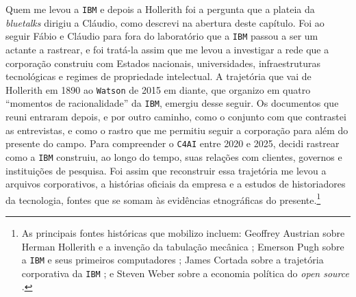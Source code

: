 Quem me levou a \texttt{IBM} e depois a Hollerith foi a pergunta que a plateia da \textit{bluetalks} dirigiu a Cláudio, como descrevi na abertura deste capítulo. Foi ao seguir Fábio e Cláudio para fora do laboratório que a \texttt{IBM} passou a ser um actante a rastrear, e foi tratá-la assim que me levou a investigar a rede que a corporação construiu com Estados nacionais, universidades, infraestruturas tecnológicas e regimes de propriedade intelectual. A trajetória que vai de Hollerith em 1890 ao \texttt{Watson} de 2015 em diante, que organizo em quatro \enquote{momentos de racionalidade} da \texttt{IBM}, emergiu desse seguir. Os documentos que reuni entraram depois, e por outro caminho, como o conjunto com que contrastei as entrevistas, e como o rastro que me permitiu seguir a corporação para além do presente do campo. Para compreender o \texttt{C4AI} entre 2020 e 2025, decidi rastrear como a \texttt{IBM} construiu, ao longo do tempo, suas relações com clientes, governos e instituições de pesquisa. Foi assim que reconstruir essa trajetória me levou a arquivos corporativos, a histórias oficiais da empresa e a estudos de historiadores da tecnologia, fontes que se somam às evidências etnográficas do presente.\footnote{As principais fontes históricas que mobilizo incluem: Geoffrey Austrian sobre Herman Hollerith e a invenção da tabulação mecânica \parencite{Austrian1982Hollerith}; Emerson Pugh sobre a \texttt{IBM} e seus primeiros computadores \parencite{Pugh1995Building}; James Cortada sobre a trajetória corporativa da \texttt{IBM} \parencite{Cortada2019IBM}; e Steven Weber sobre a economia política do \textit{open source} \parencite{weber2004success}.}

